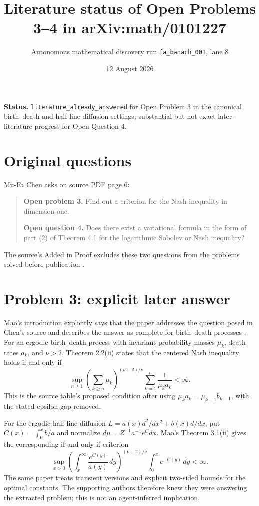 \documentclass[11pt]{article}
\title{Literature status of Open Problems 3--4 in arXiv:math/0101227}
\author{Autonomous mathematical discovery run \texttt{fa\_banach\_001}, lane 8}
\date{12 August 2026}
\begin{document}
\maketitle

\noindent\textbf{Status.}
\texttt{literature\_already\_answered} for Open Problem 3 in the canonical
birth--death and half-line diffusion settings; substantial but not exact
later-literature progress for Open Question 4.

\section*{Original questions}
Mu-Fa Chen asks on source PDF page 6:
\begin{quote}
\textbf{Open problem 3.} Find out a criterion for the Nash inequality in
dimension one.

\textbf{Open question 4.} Does there exist a variational formula in the form
of part (2) of Theorem 4.1 for the logarithmic Sobolev or Nash inequality?
\end{quote}
The source's Added in Proof excludes these two questions from the problems
solved before publication \cite{Chen01}.

\section*{Problem 3: explicit later answer}
Mao's introduction explicitly says that the paper addresses the question
posed in Chen's source and describes the answer as complete for birth--death
processes \cite{Mao02}.  For an ergodic birth--death process with invariant
probability masses $\mu_k$, death rates $a_k$, and $\nu>2$, Theorem 2.2(ii)
states that the centered Nash inequality holds if and only if
\[
 \sup_{n\ge1}
 \left(\sum_{k\ge n}\mu_k\right)^{(\nu-2)/\nu}
 \sum_{k=1}^{n}\frac1{\mu_k a_k}<\infty.
\]
This is the source table's proposed condition after using
$\mu_k a_k=\mu_{k-1}b_{k-1}$, with the stated epsilon gap removed.

For the ergodic half-line diffusion
$L=a(x)d^2/dx^2+b(x)d/dx$, put
$C(x)=\int_0^x b/a$ and normalize
$d\mu=Z^{-1}a^{-1}e^Cdx$.  Mao's Theorem 3.1(ii) gives the corresponding
if-and-only-if criterion
\[
 \sup_{x>0}
 \left(\int_x^\infty\frac{e^{C(y)}}{a(y)}\,dy\right)^{(\nu-2)/\nu}
 \int_0^x e^{-C(y)}\,dy<\infty.
\]
The same paper treats transient versions and explicit two-sided bounds for
the optimal constants.  The supporting authors therefore knew they were
answering the extracted problem; this is not an agent-inferred implication.
\end{document}
